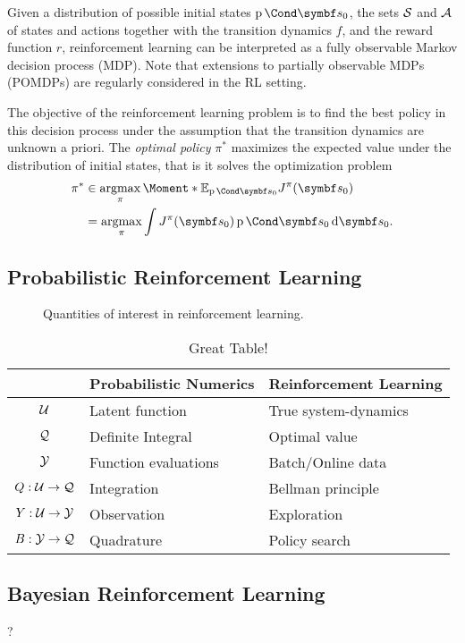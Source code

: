 Given a distribution of possible initial states $\Prob{\mat{s}_0}$, the sets $\mathcal{S}$ and $\mathcal{A}$ of states and actions together with the transition dynamics $f$, and the reward function $r$, reinforcement learning can be interpreted as a fully observable Markov decision process (MDP).
Note that extensions to partially observable MDPs (POMDPs) are regularly considered in the RL setting.

The objective of the reinforcement learning problem is to find the best policy in this decision process under the assumption that the transition dynamics are unknown a priori.
The \emph{optimal policy} $\pi^*$ maximizes the expected value under the distribution of initial states, that is it solves the optimization problem
\begin{align}
    \label{eq:bayesian_rl:optimal_policy}
    \begin{split}
        \pi^\ast &\in \argmax_{\pi} \Moment*{\E_{\Prob{\mat{s}_0}}}{J^\pi(\mat{s}_0)} \\
        &= \argmax_{\pi} \int J^\pi(\mat{s}_0) \Prob{\mat{s}_0} \diff \mat{s}_0.
    \end{split}
\end{align}


\subsection{Probabilistic Reinforcement Learning}
\label{toc:bayesian_rl:probabilistic_reinforcement_learning}
\begin{figure}[t]
    \centering
    
    \caption[Quantities of interest in reinforcement learning]{
        Quantities of interest in reinforcement learning.
        \label{fig:bayesian_rl:quantities_of_interest_rl}
    }
\end{figure}
\begin{table}[t]
    \centering
    \caption{Great Table!}
    \label{tab:bayesian_rl:label}
    \begin{tabularx}{\textwidth}{cYY}
        \toprule
                          & Probabilistic Numerics & Reinforcement Learning \\
        \midrule
        $\mathcal{U}$             & Latent function        & True system-dynamics   \\
        $\mathcal{Q}$             & Definite Integral      & Optimal value          \\
        $\mathcal{Y}$             & Function evaluations   & Batch/Online data      \\
        \midrule
        $Q : \mathcal{U} \to \mathcal{Q}$ & Integration            & Bellman principle      \\
        $Y : \mathcal{U} \to \mathcal{Y}$ & Observation            & Exploration            \\
        $B : \mathcal{Y} \to \mathcal{Q}$ & Quadrature             & Policy search          \\
        \bottomrule
    \end{tabularx}
\end{table}


\subsection{Bayesian Reinforcement Learning}
\label{toc:bayesian_rl:bayesian_reinforcement_learning}
?
